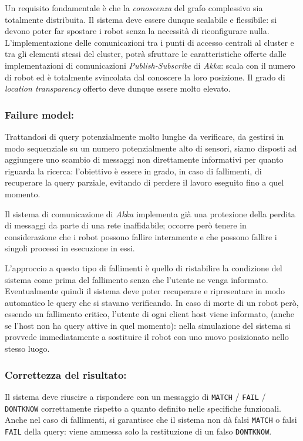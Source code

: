 Un requisito fondamentale è che
la \emph{conoscenza} del grafo complessivo sia totalmente distribuita.
Il sistema deve essere dunque scalabile e flessibile:
si devono poter far spostare i robot senza la necessità di
riconfigurare nulla. L'implementazione delle
comunicazioni tra i punti di accesso centrali al cluster e
tra gli elementi stessi del cluster, potrà
sfruttare le caratteristiche offerte dalle implementazioni di
comunicazioni \emph{Publish-Subscribe} di \emph{Akka}:
scala con il numero di robot ed è totalmente svincolata dal conoscere
la loro posizione.
Il grado di \emph{location transparency} offerto
deve dunque essere molto elevato.

\subsubsection*{Failure model:}
Trattandosi di query potenzialmente molto lunghe da verificare,
da gestirsi in modo sequenziale su un numero potenzialmente alto di sensori,
siamo disposti ad aggiungere uno scambio di messaggi non direttamente
informativi per quanto riguarda la ricerca: l'obiettivo è essere in grado,
in caso di fallimenti, di recuperare la query parziale,
evitando di perdere il lavoro eseguito fino a quel momento.

Il sistema di comunicazione di \emph{Akka} implementa già una
protezione della perdita di messaggi da parte di una rete inaffidabile;
occorre però tenere in considerazione che i robot possono fallire
interamente e che possono fallire i singoli processi in esecuzione in essi.

L'approccio a questo tipo di fallimenti è quello di ristabilire la
condizione del sistema come prima del fallimento senza che
l'utente ne venga informato. Eventualmente quindi il sistema deve poter
recuperare e ripresentare in modo automatico le query che si stavano
verificando. In caso di morte di un robot però,
essendo un fallimento critico, l'utente di ogni client host viene informato,
(anche se l'host non ha query attive in quel momento):
nella simulazione del sistema si provvede immediatamente a
sostituire il robot con uno nuovo posizionato nello stesso luogo.

\subsubsection*{Correttezza del risultato:}
Il sistema deve riuscire a rispondere con un messaggio di
\texttt{MATCH} / \texttt{FAIL} / \texttt{DONTKNOW} correttamente
rispetto a quanto definito nelle specifiche funzionali.
Anche nel caso di fallimenti, si garantisce che
il sistema non dà falsi \texttt{MATCH} o falsi \texttt{FAIL} della query:
viene ammessa solo la restituzione di un falso \texttt{DONTKNOW}.

